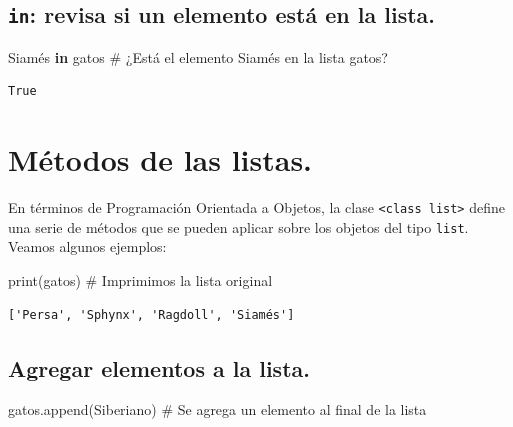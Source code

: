 \documentclass[
  spanish,
  letterpaper,
]{scrbook}
\newenvironment{Shaded}{\begin{snugshade}}{\end{snugshade}}
\newcommand{\BuiltInTok}[1]{\textcolor[rgb]{0.00,0.23,0.31}{#1}}
\newcommand{\CommentTok}[1]{\textcolor[rgb]{0.37,0.37,0.37}{#1}}
\newcommand{\KeywordTok}[1]{\textcolor[rgb]{0.00,0.23,0.31}{\textbf{#1}}}
\newcommand{\NormalTok}[1]{\textcolor[rgb]{0.00,0.23,0.31}{#1}}
\newcommand{\StringTok}[1]{\textcolor[rgb]{0.13,0.47,0.30}{#1}}
\theoremstyle{definition}
\theoremstyle{remark}
\begin{document}
\subsection{\texorpdfstring{\texttt{in}: revisa si un elemento está en
la
lista.}{in: revisa si un elemento está en la lista.}}\label{in-revisa-si-un-elemento-estuxe1-en-la-lista.}

\begin{Shaded}
\begin{Highlighting}[]
\CommentTok{\textquotesingle{}Siamés\textquotesingle{}} \KeywordTok{in}\NormalTok{ gatos }\CommentTok{\# ¿Está el elemento \textasciigrave{}Siamés\textasciigrave{} en la lista gatos?}
\end{Highlighting}
\end{Shaded}

\begin{verbatim}
True
\end{verbatim}

\section{Métodos de las listas.}\label{muxe9todos-de-las-listas.}

En términos de Programación Orientada a Objetos, la clase
\texttt{\textless{}class\ \textquotesingle{}list\textquotesingle{}\textgreater{}}
define una serie de métodos que se pueden aplicar sobre los objetos del
tipo \texttt{list}. Veamos algunos ejemplos:

\begin{Shaded}
\begin{Highlighting}[]
\BuiltInTok{print}\NormalTok{(gatos) }\CommentTok{\# Imprimimos la lista original}
\end{Highlighting}
\end{Shaded}

\begin{verbatim}
['Persa', 'Sphynx', 'Ragdoll', 'Siamés']
\end{verbatim}

\subsection{Agregar elementos a la
lista.}\label{agregar-elementos-a-la-lista.}

\begin{Shaded}
\begin{Highlighting}[]
\NormalTok{gatos.append(}\StringTok{\textquotesingle{}Siberiano\textquotesingle{}}\NormalTok{) }\CommentTok{\# Se agrega un elemento al final de la lista}
\end{Highlighting}
\end{Shaded}
\end{document}

